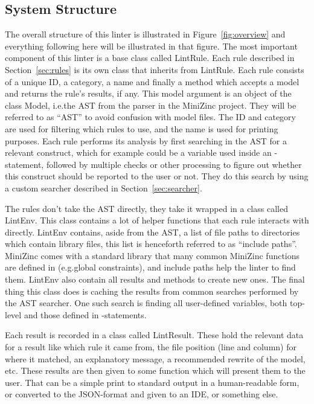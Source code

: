 \documentclass[a4paper,12pt]{article}
\newcommand{\mi}[1]{\mbox{\mzninline{#1}}}
\newcommand{\cpp}[1]{\mbox{\mznfont #1}}
\begin{document}
\subsection{System Structure}\label{sec:impl:structure}


The overall structure of this linter is illustrated in Figure~\ref{fig:overview} and
everything following here will be illustrated in that figure. The most important component
of this linter is a base class called \cpp{LintRule}. Each rule described in
Section~\ref{sec:rules} is its own class that inherits from \cpp{LintRule}. Each rule
consists of a unique ID, a category, %
a name and finally a method which accepts a model and returns the rule's results, if any.
This model argument is an object of the class \cpp{Model}, i.e.\@ the AST from the parser
in the MiniZinc project. They will be referred to as ``AST'' to avoid confusion with model
files. The ID and category are used for filtering which rules to use, and the name is used
for printing purposes. Each rule performs its analysis by first searching in the AST for a
relevant construct, which for example could be a variable used inside an
\mi{if}-statement, followed by multiple checks or other processing to figure out whether
this construct should be reported to the user or not. They do this search by using a
custom searcher described in Section~\ref{sec:searcher}.

\begin{sloppypar}
The rules don't take the AST directly, they take it wrapped in a class called
\cpp{LintEnv}. This class contains a lot of helper functions that each rule interacts with
directly. \cpp{LintEnv} contains, aside from the AST, a list of file paths
to directories which contain library files, this list is henceforth referred to as
``include paths''.
MiniZinc comes with a standard library that many
common MiniZinc functions are defined in (e.g.\@ global constraints), and include paths help the linter to find them.
\cpp{LintEnv} also contain all results and methods to create new ones. The final thing
this class does is caching the results from common searches performed by the AST searcher.
One such search is finding all user-defined
variables, both top-level and those defined in \mi{let}-statements.
\end{sloppypar}

Each result is recorded in a class called \cpp{LintResult}. These hold the relevant data
for a result like which rule it came from, the file position (line and column) for where it
matched, an explanatory message, a recommended rewrite of the model, etc. These results are
then given to some function which will present them to the user. That can be a simple
print to standard output in a human-readable form, or converted to the JSON-format and
given to an IDE, or something else.
\end{document}
